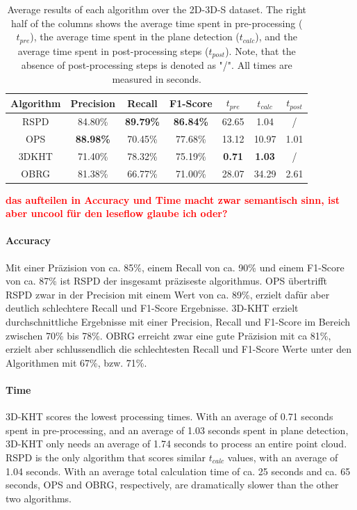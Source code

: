 \documentclass[main.tex]{subfiles}
\begin{document}
\begin{table}[H]
    \centering
    \begin{tabular}{c|cccccc}
        Algorithm & Precision        & Recall           & F1-Score         & $t_{pre}$     & $t_{calc}$    & $t_{post}$ \\ \hline
        RSPD      & 84.80\%          & \textbf{89.79\%} & \textbf{86.84\%} & 62.65         & 1.04          & /          \\
        OPS       & \textbf{88.98\%} & 70.45\%          & 77.68\%          & 13.12         & 10.97         & 1.01       \\
        3DKHT     & 71.40\%          & 78.32\%          & 75.19\%          & \textbf{0.71} & \textbf{1.03} & /          \\
        OBRG      & 81.38\%          & 66.77\%          & 71.00\%          & 28.07         & 34.29         & 2.61
    \end{tabular}
    \caption[Overall 2D-3D-S Results]{Average results of each algorithm over the 2D-3D-S dataset. The right half of the columns shows the average time spent in
        pre-processing ($t_{pre}$), the average time spent in the plane detection ($t_{calc}$), and the average time spent in post-processing steps ($t_{post}$).
        Note, that the absence of post-processing steps is denoted as "/". All times are measured in seconds.}
    \label{tab:res-3d2ds-total}
\end{table}

\textbf{\textcolor{red}{das aufteilen in Accuracy und Time macht zwar semantisch sinn, ist aber uncool für den leseflow glaube ich oder?}}

\paragraph{Accuracy}
Mit einer Präzision von ca. 85\%, einem Recall von ca. 90\% und einem F1-Score von ca. 87\% ist RSPD der insgesamt präziseste algorithmus.
OPS übertrifft RSPD zwar in der Precision mit einem Wert von ca. 89\%, erzielt dafür aber deutlich schlechtere Recall und F1-Score Ergebnisse.
3D-KHT erzielt durchschnittliche Ergebnisse mit einer Precision, Recall und F1-Score im Bereich zwischen 70\% bis 78\%.
OBRG erreicht zwar eine gute Präzision mit ca 81\%, erzielt aber schlussendlich die schlechtesten Recall und F1-Score Werte unter den Algorithmen mit
67\%, bzw. 71\%.

\paragraph{Time}
3D-KHT scores the lowest processing times. With an average of 0.71 seconds spent in pre-processing, and an average of 1.03 seconds spent in plane detection,
3D-KHT only needs an average of 1.74 seconds to process an entire point cloud. RSPD is the only algorithm that scores similar $t_{calc}$ values, with an 
average of 1.04 seconds.
With an average total calculation time of ca. 25 seconds and ca. 65 seconds, OPS and OBRG, respectively, are dramatically slower than the other two algorithms.
\end{document}
